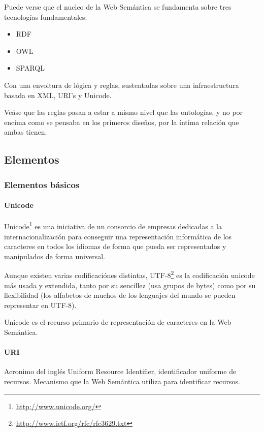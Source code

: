 Puede verse que el nucleo de la Web Semántica se fundamenta sobre tres 
tecnologías fundamentales:

\begin{itemize}
  \item RDF
  \item OWL
  \item SPARQL
\end{itemize}

Con una envoltura de lógica y reglas, sustentadas sobre una infraestructura 
basada en XML, URI's y Unicode.

Veáse que las reglas pasan a estar a mismo nivel que las ontologías, y no por
encima como se pensaba en los primeros diseños, por la íntima relación que ambas
tienen.

\subsection{Elementos}

\subsubsection{Elementos básicos}

\paragraph{Unicode}

Unicode\footnote{\url{http://www.unicode.org/}} es una iniciativa de un consorcio de 
empresas dedicadas a la internacionalización para conseguir una representación 
informática de los caracteres en todos los idiomas de forma que pueda ser representados
y manipulados de forma universal. 

Aunque existen varias codificaciónes distintas, 
UTF-8\footnote{\url{http://www.ietf.org/rfc/rfc3629.txt}} es la codificación 
unicode más usada y extendida, tanto por su sencillez (usa grupos de bytes) 
como por su flexibilidad (los alfabetos de muchos de los lenguajes del mundo 
se pueden representar en UTF-8).

Unicode es el recurso primario de representación de caracteres en la Web Semántica.

\paragraph{URI}

Acronimo del inglés Uniform Resource Identifier, identificador uniforme de recursos.
Mecanismo que la Web Semántica utiliza para identificar recursos. 


